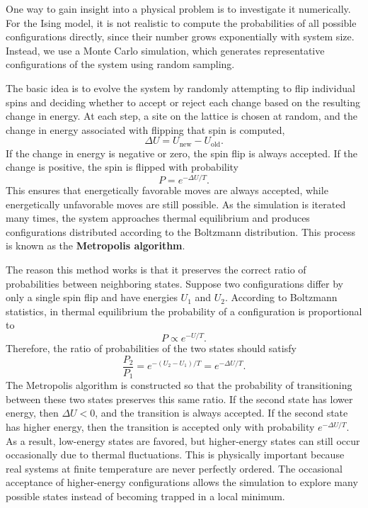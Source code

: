 One way to gain insight into a physical problem is to investigate it numerically. For the Ising model, it is not realistic to compute the probabilities of all possible configurations directly, since their number grows exponentially with system size. Instead, we use a Monte Carlo simulation, which generates representative configurations of the system using random sampling.

The basic idea is to evolve the system by randomly attempting to flip individual spins and deciding whether to accept or reject each change based on the resulting change in energy. At each step, a site on the lattice is chosen at random, and the change in energy associated with flipping that spin is computed,
    \[\Delta U = U_{\text{new}} - U_{\text{old}}.\]
If the change in energy is negative or zero, the spin flip is always accepted. If the change is positive, the spin is flipped with probability
    \[P = e^{-\Delta U / T}.\]
This ensures that energetically favorable moves are always accepted, while energetically unfavorable moves are still possible. As the simulation is iterated many times, the system approaches thermal equilibrium and produces configurations distributed according to the Boltzmann distribution. This process is known as the \textbf{Metropolis algorithm}. 

The reason this method works is that it preserves the correct ratio of probabilities between neighboring states. Suppose two configurations differ by only a single spin flip and have energies \(U_1\) and \(U_2\). According to Boltzmann statistics, in thermal equilibrium the probability of a configuration is proportional to
    \[P \propto e^{-U/T}.\]
Therefore, the ratio of probabilities of the two states should satisfy
    \[\frac{P_2}{P_1}=e^{-(U_2-U_1)/T}=e^{-\Delta U/T}.\]
The Metropolis algorithm is constructed so that the probability of transitioning between these two states preserves this same ratio. If the second state has lower energy, then \(\Delta U < 0\), and the transition is always accepted. If the second state has higher energy, then the transition is accepted only with probability \(e^{-\Delta U/T}\). As a result, low-energy states are favored, but higher-energy states can still occur occasionally due to thermal fluctuations. This is physically important because real systems at finite temperature are never perfectly ordered. The occasional acceptance of higher-energy configurations allows the simulation to explore many possible states instead of becoming trapped in a local minimum.

